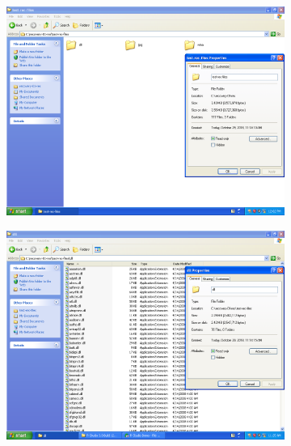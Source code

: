 \documentclass[
	a4paper,
	oneside,
	DIV = 12,
	fontsize = 13pt,
	headings = normal,
]{scrartcl}
\begin{document}
		\begin{figure}
			\centering
			\begin{subfigure}{0.5\columnwidth}
				\centering
				\includegraphics[height = 9\baselineskip]{./assets/y03s01-pcdiag-lab-03-p07.png}
				\caption{}
				\label{subfig:03-01-root}
			\end{subfigure}%
			\begin{subfigure}{0.5\columnwidth}
				\centering
				\includegraphics[height = 9\baselineskip]{./assets/y03s01-pcdiag-lab-03-p08.png}
				\caption{}
				\label{subfig:03-02-jpg}
			\end{subfigure}
			\begin{subfigure}{0.5\columnwidth}
				\centering

\end{subfigure}
\end{figure}
\end{document}
